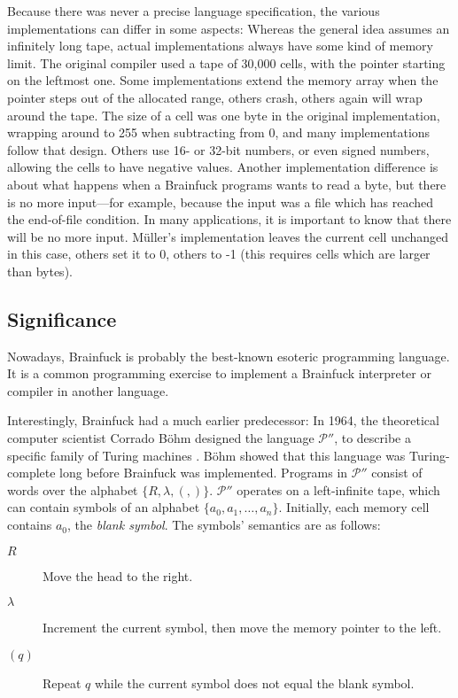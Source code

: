 Because there was never a precise language specification, the various implementations can differ in some aspects:
Whereas the general idea assumes an infinitely long tape, actual implementations always have some kind of memory limit. The original compiler used a tape of 30,000 cells, with the pointer starting on the leftmost one. Some implementations extend the memory array when the pointer steps out of the allocated range, others crash, others again will wrap around the tape.
The size of a cell was one byte in the original implementation, wrapping around to 255 when subtracting from 0, and many implementations follow that design. Others use 16- or 32-bit numbers, or even signed numbers, allowing the cells to have negative values.
Another implementation difference is about what happens when a Brainfuck programs wants to read a byte, but there is no more input---for example, because the input was a file which has reached the end-of-file condition. In many applications, it is important to know that there will be no more input. Müller's implementation leaves the current cell unchanged in this case, others set it to 0, others to -1 (this requires cells which are larger than bytes).

\subsection{Significance}

Nowadays, Brainfuck is probably the best-known esoteric programming language. It is a common programming exercise to implement a Brainfuck interpreter or compiler in another language.

\label{pprimeprime}

Interestingly, Brainfuck had a much earlier predecessor: In 1964, the theoretical computer scientist Corrado Böhm designed the language $\mathcal{P}''$, to describe a specific family of Turing machines \cite{bohm1964family}. Böhm showed that this language was Turing-complete long before Brainfuck was implemented. Programs in $\mathcal{P}''$ consist of words over the alphabet $\{R, \lambda, (, )\}$. $\mathcal{P}''$ operates on a left-infinite tape, which can contain symbols of an alphabet $\{a_0, a_1, \dots, a_n\}$. Initially, each memory cell contains $a_0$, the \emph{blank symbol}. The symbols' semantics are as follows:

\begin{description}
    \item[\boldmath$R$] Move the head to the right.
    \item[\boldmath$\lambda$] Increment the current symbol, then move the memory pointer to the left.
    \item[\boldmath$(q)$] Repeat $q$ while the current symbol does not equal the blank symbol.
\end{description}

